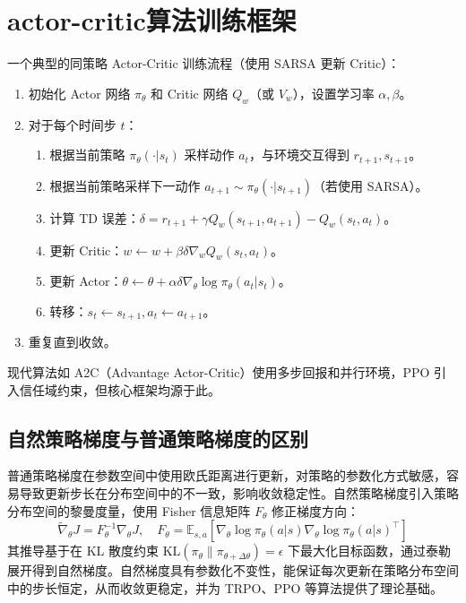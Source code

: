 \documentclass{article}
\begin{document}
\section{actor-critic算法训练框架}
一个典型的同策略 Actor-Critic 训练流程（使用 SARSA 更新 Critic）：
\begin{enumerate}
    \item 初始化 Actor 网络 \(\pi_\theta\) 和 Critic 网络 \(Q_w\)（或 \(V_w\)），设置学习率 \(\alpha, \beta\)。
    \item 对于每个时间步 \(t\)：
    \begin{enumerate}
        \item 根据当前策略 \(\pi_\theta(\cdot|s_t)\) 采样动作 \(a_t\)，与环境交互得到 \(r_{t+1}, s_{t+1}\)。
        \item 根据当前策略采样下一动作 \(a_{t+1} \sim \pi_\theta(\cdot|s_{t+1})\)（若使用 SARSA）。
        \item 计算 TD 误差：\(\delta = r_{t+1} + \gamma Q_w(s_{t+1},a_{t+1}) - Q_w(s_t,a_t)\)。
        \item 更新 Critic：\(w \leftarrow w + \beta \delta \nabla_w Q_w(s_t,a_t)\)。
        \item 更新 Actor：\(\theta \leftarrow \theta + \alpha \delta \nabla_\theta \log \pi_\theta(a_t|s_t)\)。
        \item 转移：\(s_t \leftarrow s_{t+1}, a_t \leftarrow a_{t+1}\)。
    \end{enumerate}
    \item 重复直到收敛。
\end{enumerate}
现代算法如 A2C（Advantage Actor-Critic）使用多步回报和并行环境，PPO 引入信任域约束，但核心框架均源于此。

\subsection{自然策略梯度与普通策略梯度的区别}
普通策略梯度在参数空间中使用欧氏距离进行更新，对策略的参数化方式敏感，容易导致更新步长在分布空间中的不一致，影响收敛稳定性。自然策略梯度引入策略分布空间的黎曼度量，使用 Fisher 信息矩阵 \(F_\theta\) 修正梯度方向：
\[
\tilde{\nabla}_\theta J = F_\theta^{-1} \nabla_\theta J, \quad F_\theta = \mathbb{E}_{s,a} \left[ \nabla_\theta \log \pi_\theta(a|s) \nabla_\theta \log \pi_\theta(a|s)^\top \right] \tag{13}
\]
其推导基于在 KL 散度约束 \(\text{KL}(\pi_\theta \| \pi_{\theta+\Delta\theta}) = \epsilon\) 下最大化目标函数，通过泰勒展开得到自然梯度。自然梯度具有参数化不变性，能保证每次更新在策略分布空间中的步长恒定，从而收敛更稳定，并为 TRPO、PPO 等算法提供了理论基础。
\end{document}
